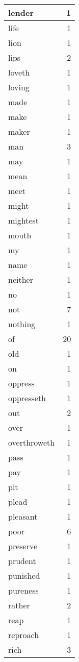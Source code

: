 \begin{center}
\begin{longtable}{l|r}
lender & 1\\ \hline 
life & 1\\ \hline 
lion & 1\\ \hline 
lips & 2\\ \hline 
loveth & 1\\ \hline 
loving & 1\\ \hline 
made & 1\\ \hline 
make & 1\\ \hline 
maker & 1\\ \hline 
man & 3\\ \hline 
may & 1\\ \hline 
mean & 1\\ \hline 
meet & 1\\ \hline 
might & 1\\ \hline 
mightest & 1\\ \hline 
mouth & 1\\ \hline 
my & 1\\ \hline 
name & 1\\ \hline 
neither & 1\\ \hline 
no & 1\\ \hline 
not & 7\\ \hline 
nothing & 1\\ \hline 
of & 20\\ \hline 
old & 1\\ \hline 
on & 1\\ \hline 
oppress & 1\\ \hline 
oppresseth & 1\\ \hline 
out & 2\\ \hline 
over & 1\\ \hline 
overthroweth & 1\\ \hline 
pass & 1\\ \hline 
pay & 1\\ \hline 
pit & 1\\ \hline 
plead & 1\\ \hline 
pleasant & 1\\ \hline 
poor & 6\\ \hline 
preserve & 1\\ \hline 
prudent & 1\\ \hline 
punished & 1\\ \hline 
pureness & 1\\ \hline 
rather & 2\\ \hline 
reap & 1\\ \hline 
reproach & 1\\ \hline 
rich & 3\\ \hline 

\end{longtable}
\end{center}
